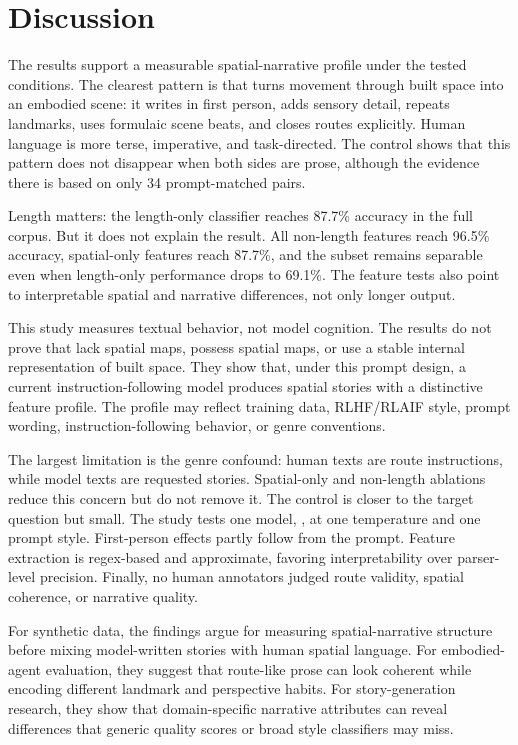 \section{Discussion}
\label{sec:discussion}

The results support a measurable \llm spatial-narrative profile under the tested conditions. The clearest pattern is that \gptmini turns movement through built space into an embodied scene: it writes in first person, adds sensory detail, repeats landmarks, uses formulaic scene beats, and closes routes explicitly. Human \rtr language is more terse, imperative, and task-directed. The \writingprompts control shows that this pattern does not disappear when both sides are prose, although the evidence there is based on only 34 prompt-matched pairs.

Length matters: the length-only classifier reaches 87.7\% accuracy in the full corpus. But it does not explain the result. All non-length features reach 96.5\% accuracy, spatial-only features reach 87.7\%, and the \writingprompts subset remains separable even when length-only performance drops to 69.1\%. The feature tests also point to interpretable spatial and narrative differences, not only longer output.

This study measures textual behavior, not model cognition. The results do not prove that \llms lack spatial maps, possess spatial maps, or use a stable internal representation of built space. They show that, under this prompt design, a current instruction-following model produces spatial stories with a distinctive feature profile. The profile may reflect training data, RLHF/RLAIF style, prompt wording, instruction-following behavior, or genre conventions.

The largest limitation is the \rtr genre confound: human texts are route instructions, while model texts are requested stories. Spatial-only and non-length ablations reduce this concern but do not remove it. The \writingprompts control is closer to the target question but small. The study tests one model, \gptmini, at one temperature and one prompt style. First-person effects partly follow from the prompt. Feature extraction is regex-based and approximate, favoring interpretability over parser-level precision. Finally, no human annotators judged route validity, spatial coherence, or narrative quality.

For synthetic data, the findings argue for measuring spatial-narrative structure before mixing model-written stories with human spatial language. For embodied-agent evaluation, they suggest that route-like prose can look coherent while encoding different landmark and perspective habits. For story-generation research, they show that domain-specific narrative attributes can reveal differences that generic quality scores or broad style classifiers may miss.
